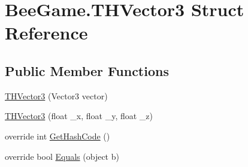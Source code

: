 \hypertarget{struct_bee_game_1_1_t_h_vector3}{}\section{Bee\+Game.\+T\+H\+Vector3 Struct Reference}
\label{struct_bee_game_1_1_t_h_vector3}
\subsection*{Public Member Functions}
\begin{DoxyCompactItemize}
\item 
\hyperlink{struct_bee_game_1_1_t_h_vector3_ad1b3467b019ea95fc114536aab566fb4}{T\+H\+Vector3} (Vector3 vector)
\item 
\hyperlink{struct_bee_game_1_1_t_h_vector3_aa2dd19cb61f71544d9126e647eb76b4b}{T\+H\+Vector3} (float \+\_\+x, float \+\_\+y, float \+\_\+z)
\item 
override int \hyperlink{struct_bee_game_1_1_t_h_vector3_a4a9942dbfb601a5c857676bc1dd25e43}{Get\+Hash\+Code} ()
\item 
override bool \hyperlink{struct_bee_game_1_1_t_h_vector3_af9efb591754dc8ec5994333babeed7d6}{Equals} (object b)
\end{DoxyCompactItemize}
